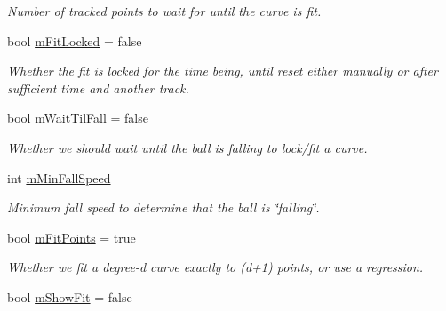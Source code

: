 \begin{DoxyCompactItemize}
\begin{DoxyCompactList}\small\item\em Number of tracked points to wait for until the curve is fit. \end{DoxyCompactList}\item 
bool \hyperlink{classProjectorWindow_abc8c3128d919b161a728fa397a748fbf}{m\+Fit\+Locked} = false\hypertarget{classProjectorWindow_abc8c3128d919b161a728fa397a748fbf}{}\label{classProjectorWindow_abc8c3128d919b161a728fa397a748fbf}

\begin{DoxyCompactList}\small\item\em Whether the fit is \textquotesingle{}locked\textquotesingle{} for the time being, until reset either manually or after sufficient time and another track. \end{DoxyCompactList}\item 
bool \hyperlink{classProjectorWindow_a15399abf80db989f7dabdae97a277d75}{m\+Wait\+Til\+Fall} = false\hypertarget{classProjectorWindow_a15399abf80db989f7dabdae97a277d75}{}\label{classProjectorWindow_a15399abf80db989f7dabdae97a277d75}

\begin{DoxyCompactList}\small\item\em Whether we should wait until the ball is falling to lock/fit a curve. \end{DoxyCompactList}\item 
int \hyperlink{classProjectorWindow_aeeba3ddf38d4347a6ad98542836a6724}{m\+Min\+Fall\+Speed}\hypertarget{classProjectorWindow_aeeba3ddf38d4347a6ad98542836a6724}{}\label{classProjectorWindow_aeeba3ddf38d4347a6ad98542836a6724}

\begin{DoxyCompactList}\small\item\em Minimum fall speed to determine that the ball is \char`\"{}falling\char`\"{}. \end{DoxyCompactList}\item 
bool \hyperlink{classProjectorWindow_ab7c213c8c2ac70cdd3d722df6f6eec9b}{m\+Fit\+Points} = true\hypertarget{classProjectorWindow_ab7c213c8c2ac70cdd3d722df6f6eec9b}{}\label{classProjectorWindow_ab7c213c8c2ac70cdd3d722df6f6eec9b}

\begin{DoxyCompactList}\small\item\em Whether we fit a degree-\/d curve exactly to (d+1) points, or use a regression. \end{DoxyCompactList}\item 
bool \hyperlink{classProjectorWindow_a9a5fcabc9a6af3b45a8b8857aec73cfb}{m\+Show\+Fit} = false\hypertarget{classProjectorWindow_a9a5fcabc9a6af3b45a8b8857aec73cfb}{}\label{classProjectorWindow_a9a5fcabc9a6af3b45a8b8857aec73cfb}


\end{DoxyCompactItemize}
